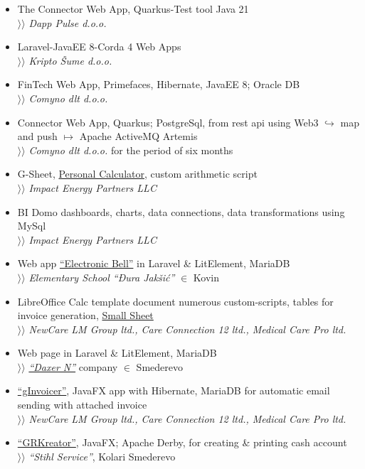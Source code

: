 \documentclass[12pt]{article}
\begin{document}
\begin{itemize}[parsep=1.5pt]
    \item The Connector Web App, Quarkus-Test tool Java 21 \\
        $\rangle\!\rangle$ \textit{Dapp Pulse d.o.o.}
    \item  Laravel-JavaEE 8-Corda 4 Web Apps \\
        $\rangle\!\rangle$ \textit{Kripto Šume d.o.o.}
    \item FinTech Web App, Primefaces, Hibernate, JavaEE 8; Oracle DB \\
        $\rangle\!\rangle$ \textit{Comyno dlt d.o.o.}
    \item Connector Web App, Quarkus; PostgreSql, from rest api using Web3 $\hookrightarrow$ map and push $\mapsto$ Apache ActiveMQ Artemis \\
        $\rangle\!\rangle$ \textit{Comyno dlt d.o.o.} for the period of six months
    \item G-Sheet, \href{https://docs.google.com/spreadsheets/d/1ztJoonmA0d0AyNDwVE1vnjpOPPpM03JF1eWCHwfQ4ZA/edit?usp=sharing}{Personal Calculator}, custom arithmetic script \\
        $\rangle\!\rangle$ \textit{Impact Energy Partners LLC}
    \item BI Domo dashboards, charts, data connections, data transformations using MySql \\
        $\rangle\!\rangle$ \textit{Impact Energy Partners LLC}
    \item Web app \href{https://zvono.nastavnikinformatike.com}{``Electronic Bell''} in Laravel \& LitElement, MariaDB \\
        $\rangle\!\rangle$ \textit{Elementary School ``Đura Jakšić''} $\in$ Kovin
    \item LibreOffice Calc template document numerous custom-scripts, tables for invoice generation, \href{https://docs.google.com/spreadsheets/d/1Hh9O7KoN8RETCPzJl5zVYV3CQdjvu2Qtbiu3tu5O9LY/edit?usp=sharing}{Small Sheet} \\ 
        $\rangle\!\rangle$ \textit{NewCare LM Group ltd., Care Connection 12 ltd., Medical Care Pro ltd.}
    \item Web page in Laravel \& LitElement, MariaDB \\
        $\rangle\!\rangle$ \href{https://www.daxern.rs}{\textit{``Daxer N''}} company $\in$ Smederevo
    \item \href{https://github.com/goranrsbg/gInvoicer}{``gInvoicer''}, JavaFX app with Hibernate, MariaDB for automatic email sending with attached invoice \\
        $\rangle\!\rangle$ \textit{NewCare LM Group ltd., Care Connection 12 ltd., Medical Care Pro ltd.}
    \item \href{https://github.com/goranrsbg/GRKreator}{``GRKreator''}, JavaFX; Apache Derby, for creating \& printing cash account \\
        $\rangle\!\rangle$ \textit{``Stihl Service''}, Kolari Smederevo
\end{itemize}
\end{document}
